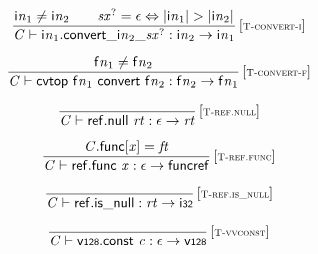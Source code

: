 $$
\begin{array}{@{}c@{}}\displaystyle
\frac{
{{\mathsf{i}}{{\mathit{n}}}}_{{1}} \neq {{\mathsf{i}}{{\mathit{n}}}}_{{2}}
 \qquad
{{\mathit{sx}}^?} = \epsilon \Leftrightarrow {|{{\mathsf{i}}{{\mathit{n}}}}_{{1}}|} > {|{{\mathsf{i}}{{\mathit{n}}}}_{{2}}|}
}{
{\mathit{C}} \vdash {{\mathsf{i}}{{\mathit{n}}}}_{{1}} . {{{{\mathsf{convert}}{\mathsf{\_}}}{{{\mathsf{i}}{{\mathit{n}}}}_{{2}}}}{\mathsf{\_}}}{{{\mathit{sx}}^?}} : {{\mathsf{i}}{{\mathit{n}}}}_{{2}} \rightarrow {{\mathsf{i}}{{\mathit{n}}}}_{{1}}
} \, {[\textsc{\scriptsize T{-}convert{-}i}]}
\qquad
\end{array}
$$

$$
\begin{array}{@{}c@{}}\displaystyle
\frac{
{{\mathsf{f}}{{\mathit{n}}}}_{{1}} \neq {{\mathsf{f}}{{\mathit{n}}}}_{{2}}
}{
{\mathit{C}} \vdash \mathsf{cvtop}~{{\mathsf{f}}{{\mathit{n}}}}_{{1}}~\mathsf{convert}~{{\mathsf{f}}{{\mathit{n}}}}_{{2}} : {{\mathsf{f}}{{\mathit{n}}}}_{{2}} \rightarrow {{\mathsf{f}}{{\mathit{n}}}}_{{1}}
} \, {[\textsc{\scriptsize T{-}convert{-}f}]}
\qquad
\end{array}
$$

\vspace{1ex}

$$
\begin{array}{@{}c@{}}\displaystyle
\frac{
}{
{\mathit{C}} \vdash \mathsf{ref.null}~{\mathit{rt}} : \epsilon \rightarrow {\mathit{rt}}
} \, {[\textsc{\scriptsize T{-}ref.null}]}
\qquad
\end{array}
$$

$$
\begin{array}{@{}c@{}}\displaystyle
\frac{
{\mathit{C}}.\mathsf{func}{}[{\mathit{x}}] = {\mathit{ft}}
}{
{\mathit{C}} \vdash \mathsf{ref.func}~{\mathit{x}} : \epsilon \rightarrow \mathsf{funcref}
} \, {[\textsc{\scriptsize T{-}ref.func}]}
\qquad
\end{array}
$$

$$
\begin{array}{@{}c@{}}\displaystyle
\frac{
}{
{\mathit{C}} \vdash \mathsf{ref.is\_null} : {\mathit{rt}} \rightarrow \mathsf{i{\scriptstyle32}}
} \, {[\textsc{\scriptsize T{-}ref.is\_null}]}
\qquad
\end{array}
$$

\vspace{1ex}

$$
\begin{array}{@{}c@{}}\displaystyle
\frac{
}{
{\mathit{C}} \vdash \mathsf{v{\scriptstyle128}}.\mathsf{const}~{\mathit{c}} : \epsilon \rightarrow \mathsf{v{\scriptstyle128}}
} \, {[\textsc{\scriptsize T{-}vvconst}]}
\qquad
\end{array}
$$

